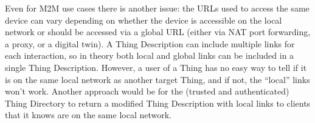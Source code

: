 Even for M2M use cases there is another issue: the URLs
used to access the same device can vary depending on whether the
device is accessible on the local network or should be accessed
via a global URL (either via NAT port forwarding, a proxy, or
a digital twin).
A Thing Description can include multiple links
for each interaction,
so in theory both local and global links
can be included in a single Thing Description.
However,
a user of a Thing has no easy way to tell if it is on
the same local network as another target Thing,
and if not, the ``local'' links won't work.
Another
approach would be for the (trusted and authenticated)
Thing Directory to return a modified
Thing Description with local links to clients that it knows 
are on the same local network.
